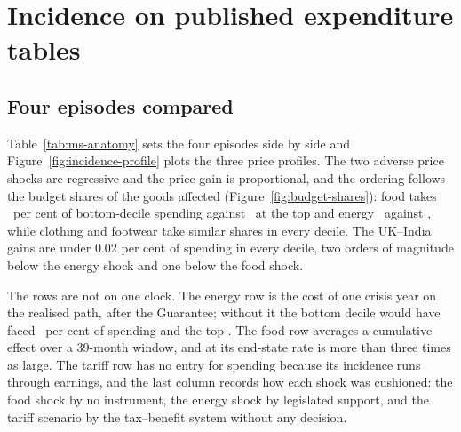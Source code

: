 \section{Incidence on published expenditure tables}\label{sec:results}

\subsection{Four episodes compared}\label{sec:results-anatomy}

Table~\ref{tab:ms-anatomy} sets the four episodes side by side and
Figure~\ref{fig:incidence-profile} plots the three price profiles.
The two adverse price shocks are regressive and the price gain is
proportional, and the ordering follows the budget shares of the goods
affected (Figure~\ref{fig:budget-shares}): food takes
\MsTcaBudgetSharePctDecOne\ per cent of bottom-decile spending against
\MsTcaBudgetSharePctDecTen\ at the top and energy
\MsEnergyBudgetSharePctDecOne\ against \MsEnergyBudgetSharePctDecTen,
while clothing and footwear take similar shares in every decile. The
UK--India gains are under 0.02 per cent of spending in every decile,
two orders of magnitude below the energy shock and one below the food
shock.

The rows are not on one clock. The energy row is the cost of one
crisis year on the realised path, after the Guarantee; without it the
bottom decile would have faced \MsEnergyGrossPctSpendDecOne\ per cent
of spending and the top \MsEnergyGrossPctSpendDecTen. The food row
averages a cumulative effect over a 39-month window, and at its
end-state rate is more than three times as large. The tariff row has no
entry for spending because its incidence runs through earnings, and
the last column records how each shock was cushioned: the food shock
by no instrument, the energy shock by legislated support, and the
tariff scenario by the tax--benefit system without any decision.

